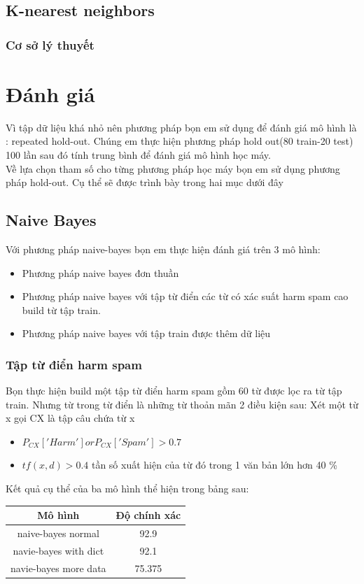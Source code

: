 \documentclass[a4paper,12pt]{report}
\begin{document}
\section{K-nearest neighbors}
\subsection{Cơ sở lý thuyết}
\chapter{Đánh giá}
Vì tập dữ liệu khá nhỏ nên phương pháp bọn em sử dụng để đánh giá mô hình là : repeated hold-out. Chúng em thực hiện phương pháp hold out(80 train-20 test) 100 lần sau đó tính trung bình để đánh giá mô hình học máy.\\

Về lựa chọn tham số cho từng phương pháp học máy bọn em sử dụng phương pháp hold-out. Cụ thể sẽ được trình bày trong hai mục dưới đây
\section{Naive Bayes}
Với phương pháp naive-bayes bọn em thực hiện đánh giá trên 3 mô hình:
\begin{itemize}
\item Phương pháp naive bayes đơn thuần
\item Phương pháp naive bayes với tập từ điển các từ có xác suất harm spam cao build từ tập train.
\item Phương pháp naive bayes với tập train được thêm dữ liệu
\end{itemize}
\subsection{Tập từ điển harm spam}
Bọn thực hiện build một tập từ điển harm spam gồm 60 từ được lọc ra từ tập train. Nhưng từ trong từ điển là những từ thoản mãn 2 điều kiện sau:
Xét một từ x gọi CX là  tập câu chứa từ x
\begin{itemize}
\item $P_{CX}['Harm'] or P_{CX}['Spam'] >0.7$
\item $tf(x,d) >0.4$ tần số xuất hiện của từ đó trong 1 văn bản lớn hơn 40 \%
\end{itemize}
Kết quả cụ thể của ba mô hình thể hiện trong bảng sau:
\begin{longtable}{|c|c|}
\hline 
Mô hình & Độ chính xác \\ \hline
naive-bayes normal & 92.9\\ \hline
navie-bayes with dict & 92.1 \\ \hline
navie-bayes more data & 75.375\\ \hline
\end{longtable}
\end{document}
